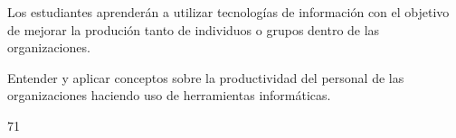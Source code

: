 \begin{syllabus}


\begin{justification}
Los estudiantes aprenderán a utilizar tecnologías de información con el objetivo de mejorar
la produción tanto de individuos o grupos dentro de las organizaciones.
\end{justification}

\begin{goals}
\item Entender y aplicar conceptos  sobre la productividad del personal de las organizaciones haciendo uso de herramientas informáticas.
\end{goals}

\begin{outcomes}
\end{outcomes}

\begin{unit}{\LUONEDef}{\LUONEBib}{7}{1}
   \begin{topics}
   	\item \ITONETopicONExONExONE
      \begin{subtopics}
      	\item \ITONETopicONExONExONExTWO
      	\item \ITONETopicONExONExONExTHREE
      \end{subtopics}	
      \item \ITONETopicONExONExTHREE
      \item \ITONETopicONExONExFOUR
      \item \ITTWOTopicONExTWOxONE
      \begin{subtopics}
	      \item \ITTWOTopicONExTWOxONExFOUR
      \end{subtopics}	
      \item \ITTWOTopicONExTWOxTHREE
      \item \ITFOURTopicONExFOURxONE
      \item \ITFOURTopicONExFOURxTWO
      \item \ITSIXTopicONExSIXxONE
      \item \ITSIXTopicONExSIXxTHREE
      \item \ITSIXTopicONExSIXxNINE
      \item \OMCTWOTopicTWOxTWOxONEONE
      \item \OMCTWOTopicTWOxTWOxONESIX
      \item \OMCTHREETopicTWOxTHREExTHREE
      \item \TDSONETopicTHREExONExTWO
      \item \TDSONETopicTHREExONExFOUR
      \item \TDSONETopicTHREExONExFIVE
   \end{topics}
	\LUONEGoal
\end{unit}


\end{syllabus}
